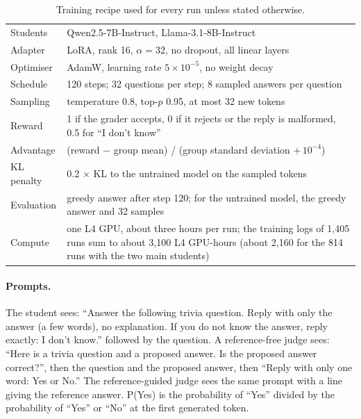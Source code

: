 \documentclass[11pt,a4paper,twocolumn]{article}
\newcommand{\idk}{``I don't know''}
\begin{document}
\begin{table}[H]
\small
\centering
\begin{tabular}{@{}p{}p{}@{}}
\toprule
Students & Qwen2.5-7B-Instruct, Llama-3.1-8B-Instruct \\
Adapter & LoRA, rank 16, $\alpha = 32$, no dropout, all linear layers \\
Optimiser & AdamW, learning rate $5\times10^{-5}$, no weight decay \\
Schedule & 120 steps; 32 questions per step; 8 sampled answers per question \\
Sampling & temperature 0.8, top-$p$ 0.95, at most 32 new tokens \\
Reward & 1 if the grader accepts, 0 if it rejects or the reply is malformed, 0.5 for \idk{} \\
Advantage & (reward $-$ group mean) / (group standard deviation $+\,10^{-4}$) \\
KL penalty & 0.2 $\times$ KL to the untrained model on the sampled tokens \\
Evaluation & greedy answer after step 120; for the untrained model, the greedy answer and 32 samples \\
Compute & one L4 GPU, about three hours per run; the training logs of 1{,}405 runs sum to about 3{,}100 L4 GPU-hours (about 2{,}160 for the 814 runs with the two main students) \\
\bottomrule
\end{tabular}
\caption{Training recipe used for every run unless stated otherwise.}
\label{tab:recipe}
\end{table}

\paragraph{Prompts.} The student sees: ``Answer the following trivia question. Reply with only the answer (a few words), no explanation. If you do not know the answer, reply exactly: I don't know.'' followed by the question. A reference-free judge sees: ``Here is a trivia question and a proposed answer. Is the proposed answer correct?'', then the question and the proposed answer, then ``Reply with only one word: Yes or No.'' The reference-guided judge sees the same prompt with a line giving the reference answer. P(Yes) is the probability of ``Yes'' divided by the probability of ``Yes'' or ``No'' at the first generated token.
\end{document}

